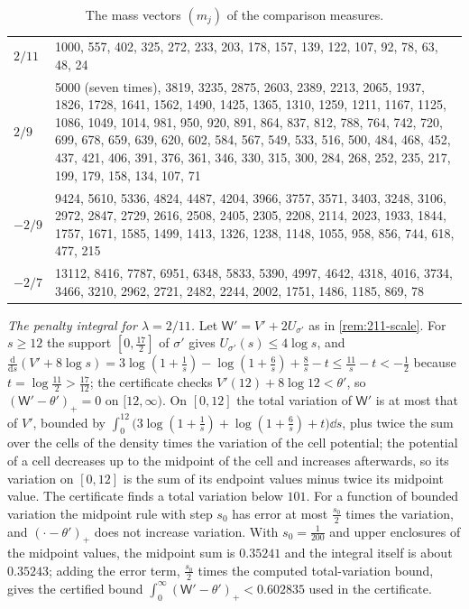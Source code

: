 \begin{table}[ht]
\centering
\caption{The mass vectors $(m_j)$ of the comparison measures.}
\label{tab:mass-vectors}
\footnotesize
\begin{tabular}{@{}lp{}@{}}
\toprule
$2/11$ & 1000, 557, 402, 325, 272, 233, 203, 178, 157, 139, 122, 107, 92, 78, 63, 48, 24\\
$2/9$ & 5000 (seven times), 3819, 3235, 2875, 2603, 2389, 2213, 2065, 1937, 1826, 1728, 1641, 1562, 1490, 1425, 1365, 1310, 1259, 1211, 1167, 1125, 1086, 1049, 1014, 981, 950, 920, 891, 864, 837, 812, 788, 764, 742, 720, 699, 678, 659, 639, 620, 602, 584, 567, 549, 533, 516, 500, 484, 468, 452, 437, 421, 406, 391, 376, 361, 346, 330, 315, 300, 284, 268, 252, 235, 217, 199, 179, 158, 134, 107, 71\\
$-2/9$ & 9424, 5610, 5336, 4824, 4487, 4204, 3966, 3757, 3571, 3403, 3248, 3106, 2972, 2847, 2729, 2616, 2508, 2405, 2305, 2208, 2114, 2023, 1933, 1844, 1757, 1671, 1585, 1499, 1413, 1326, 1238, 1148, 1055, 958, 856, 744, 618, 477, 215\\
$-2/7$ & 13112, 8416, 7787, 6951, 6348, 5833, 5390, 4997, 4642, 4318, 4016, 3734, 3466, 3210, 2962, 2721, 2482, 2244, 2002, 1751, 1486, 1185, 869, 78\\
\bottomrule
\end{tabular}
\end{table}

\emph{The penalty integral for $\lambda=2/11$.} Let $\mathsf W'=V'+2U_{\sigma'}$ as in \cref{rem:211-scale}. For $s\ge12$ the support $[0,\frac{17}2]$ of $\sigma'$ gives $U_{\sigma'}(s)\le4\log s$, and $\frac{\mathrm d}{\mathrm ds}(V'+8\log s)=3\log(1+\frac1s)-\log(1+\frac6s)+\frac8s-t\le\frac{11}s-t<-\frac12$ because $t=\log\frac{11}2>\frac{17}{12}$; the certificate checks $V'(12)+8\log12<\theta'$, so $(\mathsf W'-\theta')_+=0$ on $[12,\infty)$. On $[0,12]$ the total variation of $\mathsf W'$ is at most that of $V'$, bounded by $\int_0^{12}\bigl(3\log(1+\frac1s)+\log(1+\frac6s)+t\bigr)\dd s$, plus twice the sum over the cells of the density times the variation of the cell potential; the potential of a cell decreases up to the midpoint of the cell and increases afterwards, so its variation on $[0,12]$ is the sum of its endpoint values minus twice its midpoint value. The certificate finds a total variation below $101$. For a function of bounded variation the midpoint rule with step $s_0$ has error at most $\frac{s_0}2$ times the variation, and $(\cdot-\theta')_+$ does not increase variation. With $s_0=\frac1{200}$ and upper enclosures of the midpoint values, the midpoint sum is $0.35241$ and the integral itself is about $0.35243$; adding the error term, $\frac{s_0}2$ times the computed total-variation bound, gives the certified bound $\int_0^\infty(\mathsf W'-\theta')_+<0.602835$ used in the certificate.

